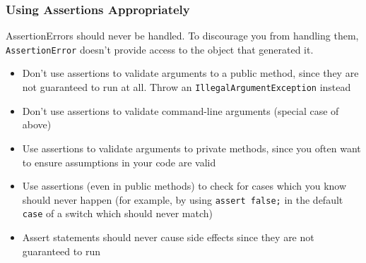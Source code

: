\subsubsection{Using Assertions Appropriately}
AssertionErrors should never be handled. To discourage you from handling them, 
\verb#AssertionError# doesn't provide access to the object that generated it.
\begin{itemize}
    \item Don't use assertions to validate arguments to a public method, since 
    they are not guaranteed to run at all. Throw an 
    \verb#IllegalArgumentException# instead
    \item Don't use assertions to validate command-line arguments (special case 
    of above)
    \item Use assertions to validate arguments to private methods, since you 
    often want to ensure assumptions in your code are valid
    \item Use assertions (even in public methods) to check for cases which you 
    know should never happen (for example, by using \verb#assert false;# in the 
    default \verb#case# of a switch which should never match)
    \item Assert statements should never cause side effects since they are not 
    guaranteed to run
\end{itemize}
